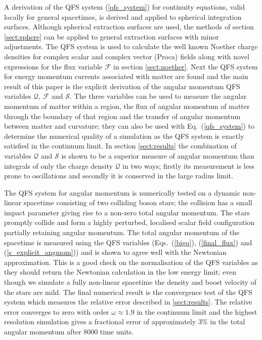 A derivation of the QFS system (\ref{qfs_system}) for continuity equations, valid locally for general spacetimes, is derived and applied to spherical integration surfaces. Although spherical extraction surfaces are used, the methods of section \ref{sect:sphere} can be applied to general extraction surfaces with minor adjustments. The QFS system is used to calculate the well known Noether charge densities for complex scalar and complex vector (Proca) fields along with novel expressions for the flux variable $\mathcal{F}$ in section \ref{sect:noether}. Next the QFS system for energy momentum currents associated with matter are found and the main result of this paper is the explicit derivation of the angular momentum QFS variables $\mathcal{Q}$,  $\mathcal{F}$ and $\mathcal{S}$. The three variables can be used to measure the angular momentum of matter within a region, the flux of angular momentum of matter through the boundary of that region and the transfer of angular momentum between matter and curvature; they can also be used with Eq.~(\ref{qfs_system}) to determine the numerical quality of a simulation as the QFS system is exactly satisfied in the continuum limit. In section \ref{sect:results} the combination of variables $\mathcal{Q}$ and $\mathcal{S}$ is shown to be a superior measure of angular momentum than integrals of only the charge density $\mathcal{Q}$ in two ways; firstly its measurement is less prone to oscillations and secondly it is conserved in the large radius limit.

The QFS system for angular momentum is numerically tested on a dynamic non-linear spacetime consisting of two colliding boson stars; the collision has a small impact parameter giving rise to a non-zero total angular momentum. The stars promptly collide and form a highly perturbed, localised scalar field configuration partially retaining angular momentum. The total angular momentum of the spacetime is measured using the QFS variables (Eqs.~(\ref{bigq}), (\ref{final_flux}) and (\ref{s_explicit_angmom})) and is shown to agree well with the Newtonian approximation. This is a good check on the normalisation of the QFS variables as they should return the Newtonian calculation in the low energy limit; even though we simulate a fully non-linear spacetime the density and boost velocity of the stars are mild. The final numerical result is the convergence test of the QFS system which measures the relative error described in \ref{sect:results}. The relative error converges to zero with order $\omega\approx 1.9$ in the continuum limit and the highest resolution simulation gives a fractional error of approximately $3 \%$ in the total angular momentum after $8000$ time units. 


